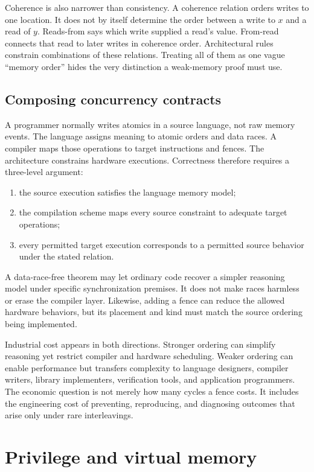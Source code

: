 Coherence is also narrower than consistency. A coherence relation orders
writes to one location. It does not by itself determine the order between a
write to \(x\) and a read of \(y\). Reads-from says which write supplied a
read's value. From-read connects that read to later writes in coherence order.
Architectural rules constrain combinations of these relations. Treating all
of them as one vague ``memory order'' hides the very distinction a weak-memory
proof must use.

\subsection{Composing concurrency contracts}

A programmer normally writes atomics in a source language, not raw memory
events. The language assigns meaning to atomic orders and data races. A
compiler maps those operations to target instructions and fences. The
architecture constrains hardware executions. Correctness therefore requires a
three-level argument:

\begin{enumerate}
\item the source execution satisfies the language memory model;
\item the compilation scheme maps every source constraint to adequate target
      operations;
\item every permitted target execution corresponds to a permitted source
      behavior under the stated relation.
\end{enumerate}

A data-race-free theorem may let ordinary code recover a simpler reasoning
model under specific synchronization premises. It does not make races
harmless or erase the compiler layer. Likewise, adding a fence can reduce the
allowed hardware behaviors, but its placement and kind must match the source
ordering being implemented.

Industrial cost appears in both directions. Stronger ordering can simplify
reasoning yet restrict compiler and hardware scheduling. Weaker ordering can
enable performance but transfers complexity to language designers, compiler
writers, library implementers, verification tools, and application
programmers. The economic question is not merely how many cycles a fence
costs. It includes the engineering cost of preventing, reproducing, and
diagnosing outcomes that arise only under rare interleavings.

\section{Privilege and virtual memory}

